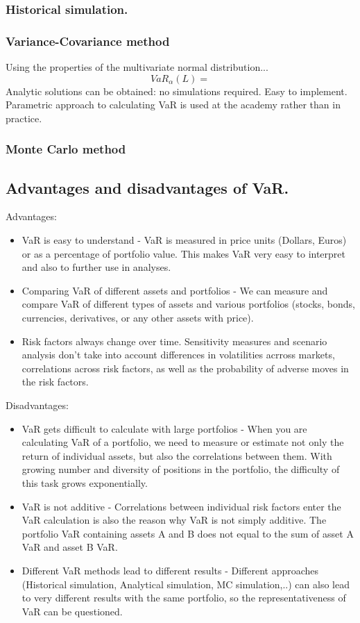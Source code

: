 \documentclass{book}
\begin{document}
\subsubsection{Historical simulation.}
\subsubsection{Variance-Covariance method}
Using the properties of the multivariate normal distribution...
$$
VaR_{\alpha}(L)=
$$
Analytic solutions can be obtained: no simulations required. Easy to implement. Parametric approach to calculating VaR is used at the academy rather than in practice.
\subsubsection{Monte Carlo method}
\subsection{Advantages and disadvantages of VaR.}
Advantages:
\begin{itemize}
\item VaR is easy to understand - VaR is measured in price units (Dollars, Euros) or as a percentage of portfolio value. This makes VaR very easy to interpret and also to further use in analyses.
\item Comparing VaR of different assets and portfolios - We can measure and compare VaR of different types of assets and various portfolios (stocks, bonds, currencies, derivatives, or any other assets with price).
\item Risk factors always change over time. Sensitivity measures and scenario analysis don't take into account differences in volatilities acrross markets, correlations across risk factors, as well as the probability of adverse moves in the risk factors.
\end{itemize}
Disadvantages:
\begin{itemize}
\item VaR gets difficult to calculate with large portfolios - When you are calculating VaR of a portfolio, we need to measure or estimate not only the return of individual assets, but also the correlations between them. With growing number and diversity of positions in the portfolio, the difficulty of this task grows exponentially.
\item VaR is not additive - Correlations between individual risk factors enter the VaR calculation is also the reason why VaR is not simply additive. The portfolio VaR containing assets A and B does not equal to the sum of asset A VaR and asset B VaR.
\item Different VaR methods lead to different results - Different approaches (Historical simulation, Analytical simulation, MC simulation,..) can also lead to very different results with the same portfolio, so the representativeness of VaR can be questioned.
\end{itemize}
\end{document}

